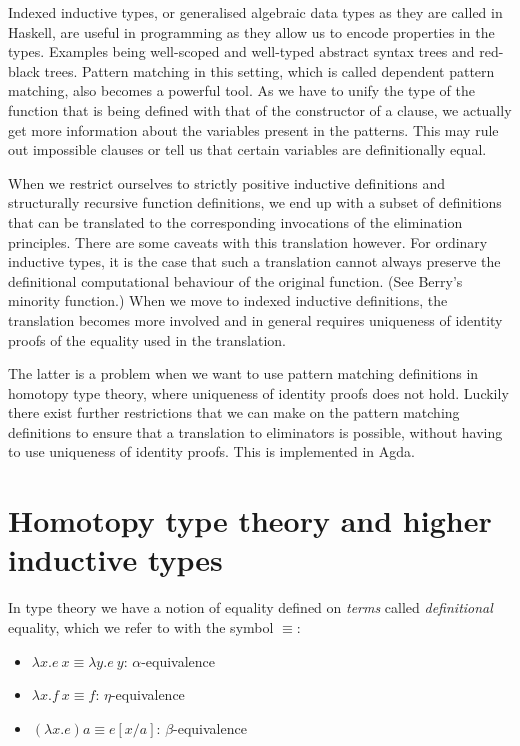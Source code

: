 Indexed inductive types, or generalised algebraic data types as they
are called in Haskell, are useful in programming as they allow us to
encode properties in the types. Examples being well-scoped and
well-typed abstract syntax trees and red-black trees. Pattern matching
in this setting, which is called dependent pattern matching, also
becomes a powerful tool. As we have to unify the type of the function
that is being defined with that of the constructor of a clause, we
actually get more information about the variables present in the
patterns. This may rule out impossible clauses or tell us that certain
variables are definitionally equal.

When we restrict ourselves to strictly positive inductive definitions
and structurally recursive function definitions, we end up with a
subset of definitions that can be translated to the corresponding
invocations of the elimination principles. There are some caveats with
this translation however. For ordinary inductive types, it is the case
that such a translation cannot always preserve the definitional
computational behaviour of the original function. (See Berry's
minority function.) When we move to indexed inductive definitions, the
translation becomes more involved and in general requires uniqueness
of identity proofs of the equality used in the translation.

The latter is a problem when we want to use pattern matching
definitions in homotopy type theory, where uniqueness of identity
proofs does not hold. Luckily there exist further restrictions that we
can make on the pattern matching definitions to ensure that a
translation to eliminators is possible, without having to use
uniqueness of identity proofs. This is implemented in Agda.


\section{Homotopy type theory and higher inductive types}

In type theory we have a notion of equality defined on \emph{terms}
called \emph{definitional} equality, which we refer to with the symbol
$\equiv$:
\begin{itemize}
\item $\lambda x . e\ x \equiv \lambda y . e\ y$: $\alpha$-equivalence
\item $\lambda x . f\ x \equiv f$: $\eta$-equivalence
\item $(\lambda x . e) a \equiv e[x/a]$: $\beta$-equivalence
\end{itemize}

